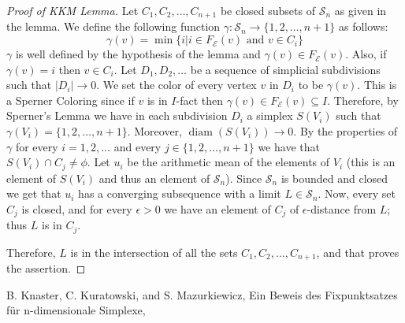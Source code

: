 \documentclass[12pt]{article}
\DeclareMathOperator{\diam}{diam}
\begin{document}
\begin{proof}[Proof of KKM Lemma]
Let $C_1,C_2,\ldots,C_{n+1}$ be closed subsets of $\mathcal{S}_n$
as given in the lemma. We define the following function
$\gamma:\mathcal{S}_n\to\{1,2,\ldots,n+1\}$ as follows:
\[
\gamma(v) = \min\{i|i\in F_\mathcal{E}(v) \textrm{ and } v\in
C_i\}
\]
$\gamma$ is well defined by the hypothesis of the lemma and
$\gamma(v) \in F_\mathcal{E}(v)$. Also, if $\gamma(v)=i$ then
$v\in C_i$. Let $D_1,D_2,\ldots$ be a sequence of simplicial
subdivisions such that $|D_i|\to0$. We set the color of every
vertex $v$ in $D_i$ to be $\gamma(v)$. This is a Sperner Coloring
since if $v$ is in $I$-fact then $\gamma(v) \in F_\mathcal{E}(v)
\subseteq I$. Therefore, by Sperner's Lemma we have in each
subdivision $D_i$ a simplex $S(V_i)$ such that
$\gamma(V_i)=\{1,2,\ldots,n+1\}$. Moreover, $\diam(S(V_i))\to0$.
By the properties of $\gamma$ for every $i=1,2,\ldots$ and every
$j\in\{1,2,\ldots,n+1\}$ we have that $S(V_i)\cap C_j\neq\phi$.
Let $u_i$ be the arithmetic mean of the elements of $V_i$ (this is
an element of $S(V_i)$ and thus an element of $\mathcal{S}_n$).
Since $\mathcal{S}_n$ is bounded and closed we get that $u_i$ has
a converging subsequence with a limit $L\in\mathcal{S}_n$. Now,
every set $C_j$ is closed, and for every $\epsilon>0$ we have an
element of $C_j$ of $\epsilon$-distance from $L$; thus $L$ is in
$C_j$.

Therefore, $L$ is in the intersection of all the sets
$C_1,C_2,\ldots,C_{n+1}$, and that proves the assertion.
\end{proof}

\begin{thebibliography}{1}

B. Knaster, C. Kuratowski, and S. Mazurkiewicz, Ein Beweis des
Fixpunktsatzes f\"ur n-dimensionale Simplexe,

\end{thebibliography}


\end{document}
